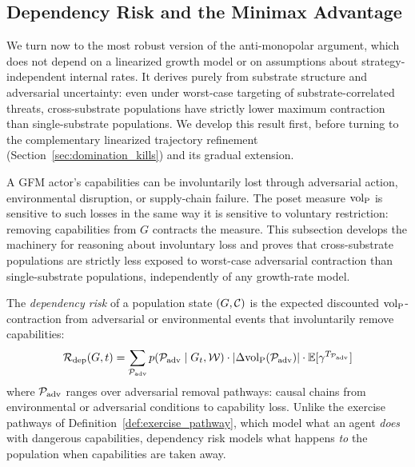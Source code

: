 \subsection{Dependency Risk and the Minimax Advantage}
\label{sec:dependency_risk}

We turn now to the most robust version of the anti-monopolar argument,
which does not depend on a linearized growth model or on assumptions about
strategy-independent internal rates. It derives purely from substrate
structure and adversarial uncertainty: even under worst-case targeting of
substrate-correlated threats, cross-substrate populations have strictly
lower maximum contraction than single-substrate populations. We develop
this result first, before turning to the complementary linearized
trajectory refinement
(Section~\ref{sec:domination_kills}) and its gradual extension.

A GFM actor's capabilities can be involuntarily lost through adversarial
action, environmental disruption, or supply-chain failure. The poset
measure ${\operatorname{vol}_{\mathrm{P}}}$ is sensitive to such losses in the same way it is
sensitive to voluntary restriction: removing capabilities from $G$
contracts the measure. This subsection develops the machinery for
reasoning about involuntary loss and proves that cross-substrate populations
are strictly less exposed to worst-case adversarial contraction than
single-substrate populations, independently of any growth-rate model.

\begin{definition}
\label{def:dependency_risk}
The \emph{dependency risk} of a population state $(G, \mathcal{C})$ is the expected
    discounted ${\operatorname{vol}_{\mathrm{P}}}$-contraction from adversarial or environmental events
    that involuntarily remove capabilities:
\begin{equation}
\label{eq:dependency_risk}
\mathcal{R}_{\mathrm{dep}}(G, t) = \sum_{\mathcal{P}_{\mathrm{adv}}}
    p(\mathcal{P}_{\mathrm{adv}} \mid G_t, \mathcal{W}) \cdot
    |\Delta {\operatorname{vol}_{\mathrm{P}}}(\mathcal{P}_{\mathrm{adv}})| \cdot
    \mathbb{E}[\gamma^{T_{\mathcal{P}_{\mathrm{adv}}}}]
\end{equation}
where $\mathcal{P}_{\mathrm{adv}}$ ranges over adversarial removal pathways:
    causal chains from environmental or adversarial conditions to capability
    loss. Unlike the exercise pathways of
    Definition~\ref{def:exercise_pathway}, which model what an agent
    \emph{does} with dangerous capabilities, dependency risk models what
    happens \emph{to} the population when capabilities are taken away.
\end{definition}

